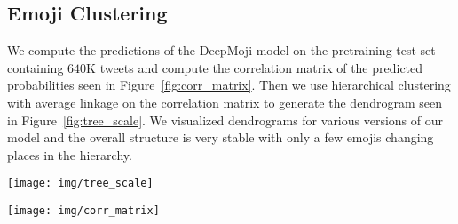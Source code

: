 \documentclass[11pt,a4paper]{article}
\begin{document}
\subsection{Emoji Clustering}

We compute the predictions of the DeepMoji model on the pretraining test set containing $640$K tweets and compute the correlation matrix of the predicted probabilities seen in Figure~\ref{fig:corr_matrix}. Then we use hierarchical clustering with average linkage on the correlation matrix to generate the dendrogram seen in Figure~\ref{fig:tree_scale}. We visualized dendrograms for various versions of our model and the overall structure is very stable with only a few emojis changing places in the hierarchy.

\begin{figure*}[thp]
  \centering
  \texttt{[image: img/tree\_scale]}
  \caption{Hierarchical clustering of the DeepMoji model's predictions across categories on the test set. The dendrogram shows how the model learns to group emojis into overall categories and subcategories based on emotional content. The y-axis is the distance on the correlation matrix of the model's predictions measured using average linkage.}
  \label{fig:tree_scale}
\end{figure*}

\begin{figure*}[htp]
  \centering
  \texttt{[image: img/corr\_matrix]}
  \caption{Correlation matrix of the model's predictions on the pretraining test set.}
  \label{fig:corr_matrix}
\end{figure*}
\end{document}
